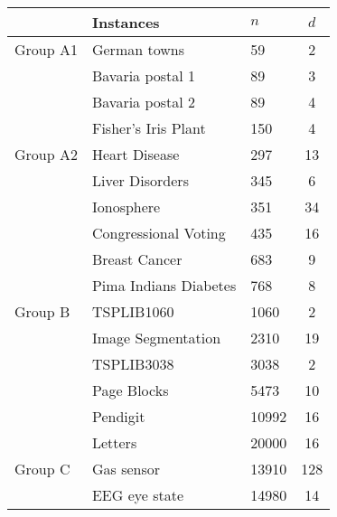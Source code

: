 \begin{table}[H]
\centering
\begin{tabular}{@{}lllc@{}}
\toprule
         & Instances                       & $n$                   & $d$                \\ \midrule
Group A1 & German towns                    & 59                    & 2                  \\
         & Bavaria postal 1                & 89                    & 3                  \\
         & Bavaria postal 2                & 89                    & 4                  \\
         & Fisher’s Iris Plant             & 150                   & 4                  \\ \midrule
Group A2 & Heart Disease                   & 297                   & 13                 \\
         & Liver Disorders                 & 345                   & 6                  \\
         & Ionosphere                      & 351                   & 34                 \\
         & Congressional Voting            & 435                   & 16                 \\
         & Breast Cancer                   & 683                   & 9                  \\
         & Pima Indians Diabetes           & 768                   & 8                  \\ \midrule
Group B  & TSPLIB1060                      & 1060                  & 2                  \\
         & Image Segmentation              & 2310                  & 19                 \\
         & TSPLIB3038                      & 3038                  & 2                  \\
         & Page Blocks                     & 5473                  & 10                 \\
         & Pendigit                        & 10992                 & 16                 \\
         & Letters                         & 20000                 & 16                 \\ \midrule
Group C  & Gas sensor                      & 13910                 & 128                \\
         & EEG eye state                   & 14980                 & 14                 \\

\end{tabular}
\end{table}

